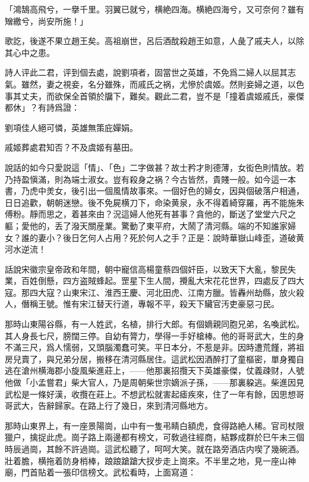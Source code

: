 \begin{myquote}
「鴻鵠高飛兮，一擧千里。羽翼已就兮，横絶四海。横絶四海兮，又可奈何？雖有矰繳兮，尚安所施！」
\end{myquote}

歌訖，後遂不果立趙王矣。高祖崩世，呂后酒酖殺趙王如意，人彘了戚夫人，以除其心中之患。

詩人评此二君，评到個去處，說劉項者，固當世之英雄，不免爲二婦人以屈其志氣。雖然，妻之視妾，名分雖殊，而戚氏之祸，尤慘於虞姬。然則妾婦之道，以色事其丈夫，而欲保全首領於牖下，難矣。觀此二君，豈不是「撞着虞姬戚氏，豪傑都休」？有詩爲證：

\begin{myquote}
劉項佳人絕可憐，英雄無策庇嬋娟。

戚姬葬處君知否？不及虞姬有墓田。
\end{myquote}

說話的如今只愛説這「情」、「色」二字做甚？故士矜才則德薄，女衒色則情放。若乃持盈愼滿，則為端士淑女。豈有殺身之祸？今古皆然，貴賤一般。如今這一本書，乃虎中羙女，後引出一個風情故事來。一個好色的婦女，因與個破落户相通，日日追歡，朝朝迷戀。後不免屍横刀下，命染黄泉，永不得着綺穿羅，再不能施朱傅粉。靜而思之，着甚來由？況這婦人他死有甚事？貪他的，斷送了堂堂六尺之軀；愛他的，丢了潑天關産業。驚動了東平府，大鬧了清河縣。端的不知誰家婦女？誰的妻小？後日乞何人占用？死於何人之手？正是：說時華嶽山峰歪，道破黄河水逆流！

話說宋徽宗皇帝政和年間，朝中寵信高楊童蔡四個奸臣，以致天下大亂，黎民失業，百姓倒懸，四方盗賊蜂起。罡星下生人間，攪亂大宋花花世界，四處反了四大寇。那四大寇？山東宋江、淮西王慶、河北田虎、江南方臘。皆轟州劫縣，放火殺人，僭稱王號。惟有宋江替天行道，專報不平，殺天下贜官汚吏豪惡刁民。

那時山東陽谷縣，有一人姓武，名植，排行大郎。有個嫡親同胞兄弟，名喚武松。其人身長七尺，膀闊三停。自幼有膂力，學得一手好槍棒。他的哥哥武大，生的身不滿三尺，爲人懦弱，又頭腦濁蠢可笑。平日本分，不惹是非。因時遭荒饉，將祖房兒賣了，與兄弟分居，搬移在清河縣居住。這武松因酒醉打了童樞密，單身獨自逃在滄州横海郡小旋風柴進莊上，——他那裏招攬天下英雄豪傑，仗義疎财，人號他做「小孟嘗君」柴大官人，乃是周朝柴世宗嫡派子孫，——那裏躱逃。柴進因見武松是一條好漢，收攬在莊上。不想武松就害起瘧疾來，住了一年有餘，因思想哥哥武大，告辭歸家。在路上行了幾日，來到清河縣地方。

那時山東界上，有一座景陽崗，山中有一隻弔睛白額虎，食得路絶人稀。官司杖限獵户，擒捉此虎。崗子路上兩邊都有榜文，可敎過往經商，結夥成群於巳午未三個時辰過崗，其餘不許過崗。這武松聽了，呵呵大笑。就在路旁酒店内喫了幾碗酒。壯着膽，横拖着防身梢棒，踉踉蹌蹌大扠步走上崗來。不半里之地，見一座山神廟，門首貼着一張印信榜文。武松看時，上面寫道：

